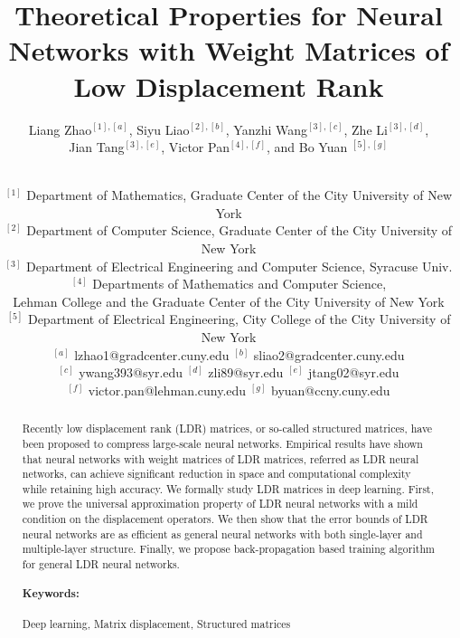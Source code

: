 \documentclass{article}
\begin{document}
\title{Theoretical Properties for Neural Networks with Weight Matrices of Low Displacement Rank}
\author{Liang Zhao$^{[1],[a]}$,
Siyu Liao$^{[2],[b]}$, Yanzhi Wang$^{[3],[c]}$, 
Zhe Li$^{[3], [d]}$,\\
Jian Tang$^{[3],[e]}$, Victor Pan$^{[4],[f]}$, and Bo Yuan
$^{[5],[g]}$ 
\\
\and\\
$^{[1]}$ Department of Mathematics, Graduate Center of the City University of New York \\
$^{[2]}$ Department of Computer Science, Graduate Center of the City University of New York \\
$^{[3]}$ Department of Electrical Engineering and Computer Science, Syracuse Univ.\\
$^{[4]}$ Departments of Mathematics and Computer Science, \\
Lehman College and the Graduate Center of the City University of New York\\
$^{[5]}$ Department of Electrical Engineering, City College of the City University of New York \\
$^{[a]}$ lzhao1@gradcenter.cuny.edu
$^{[b]}$ sliao2@gradcenter.cuny.edu\\
$^{[c]}$ ywang393@syr.edu
$^{[d]}$ zli89@syr.edu
$^{[e]}$ jtang02@syr.edu\\
$^{[f]}$ victor.pan@lehman.cuny.edu
$^{[g]}$ byuan@ccny.cuny.edu\\
} 
\date{}
\maketitle

\begin{abstract}
Recently low displacement rank (LDR) matrices, or so-called structured matrices, have been proposed to compress large-scale neural networks. Empirical results have shown that neural networks with weight matrices of LDR matrices, referred as LDR neural networks, can achieve significant reduction in space and computational complexity while retaining high accuracy. We formally study LDR matrices in deep learning. First, we prove the universal approximation property of LDR neural networks with a mild condition on the displacement operators. We then show that the error bounds of LDR neural networks are as efficient as general neural networks with both single-layer and multiple-layer structure. Finally, we propose back-propagation based training algorithm for general LDR neural networks.

\paragraph{Keywords:}Deep learning, Matrix displacement, Structured matrices


\end{abstract}
\end{document}
